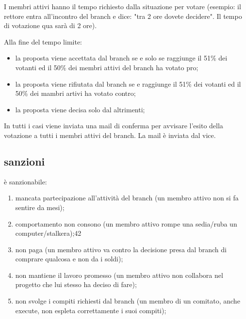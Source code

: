 \documentclass[pdf]{article}
\theoremstyle{definition}
\begin{document}
I membri attivi hanno il tempo richiesto dalla situazione per votare (esempio: il rettore entra all'incontro del branch e dice: "tra 2 ore dovete decidere". Il tempo di votazione qua sarà di 2 ore).

Alla fine del tempo limite:

\begin{itemize}
	\item la proposta viene accettata dal branch se e solo se raggiunge il 51\% dei votanti ed il 50\% dei membri attivi del branch ha votato pro;
	\item la proposta viene rifiutata dal branch se e raggiunge il 51\% dei votanti ed il 50\% dei mambri artivi ha votato contro;
	\item la proposta viene decisa solo dal \EC{} altrimenti;
\end{itemize}

In tutti i casi viene inviata una mail di conferma per  avvisare l'esito della votazione a tutti i membri attivi del branch. La mail è inviata dal vice.

\subsection{sanzioni}

è sanzionabile:

\begin{enumerate}
	\item mancata partecipazione all'attività del branch (un membro attivo non si fa sentire da mesi);
	\item comportamento non consono (un membro attivo rompe una sedia/ruba un computer/stalkera);42
	\item non paga (un membro attivo va contro la decisione presa dal branch di comprare qualcosa e non da i soldi);
	\item non mantiene il lavoro promesso (un membro attivo non collabora nel progetto che lui stesso ha deciso di fare);
	\item non svolge i compiti richiesti dal branch (un membro di un comitato, anche execute, non espleta correttamente i suoi compiti);
\end{enumerate}
\end{document}

